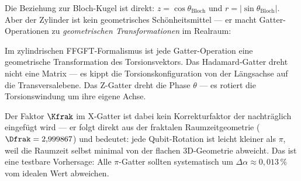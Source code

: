 Die Beziehung zur Bloch-Kugel ist direkt:
$z = \cos\theta_\text{Bloch}$ und $r = |\sin\theta_\text{Bloch}|$.
Aber der Zylinder ist kein geometrisches Schönheitsmittel ---
er macht Gatter-Operationen zu \emph{geometrischen
Transformationen} im Realraum:

\begin{center}
\end{center}

\begin{foundation}
Im zylindrischen FFGFT-Formalismus ist jede Gatter-Operation
eine geometrische Transformation des Torsionsvektors.
Das Hadamard-Gatter dreht nicht eine Matrix ---
es kippt die Torsionskonfiguration von der
Längsachse auf die Transversalebene.
Das Z-Gatter dreht die Phase $\theta$ ---
es rotiert die Torsionswindung um ihre eigene Achse.

Der Faktor $\Kfrak$ im X-Gatter ist dabei
kein Korrekturfaktor der nachträglich eingefügt wird ---
er folgt direkt aus der fraktalen Raumzeitgeometrie
($\Dfrak = 2{,}999867$) und bedeutet:
jede Qubit-Rotation ist leicht kleiner als $\pi$,
weil die Raumzeit selbst minimal von der flachen
3D-Geometrie abweicht.
Das ist eine testbare Vorhersage:
Alle $\pi$-Gatter sollten systematisch um
$\Delta\alpha \approx 0{,}013\,\%$ vom idealen Wert abweichen.
\end{foundation}

